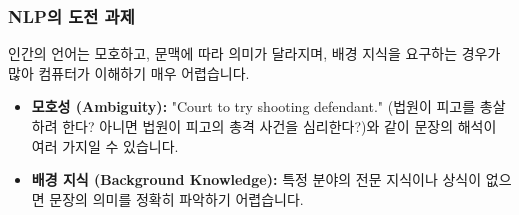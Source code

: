 \documentclass[11pt,a4paper]{article}
\begin{document}
\subsubsection{NLP의 도전 과제}
인간의 언어는 모호하고, 문맥에 따라 의미가 달라지며, 배경 지식을 요구하는 경우가 많아 컴퓨터가 이해하기 매우 어렵습니다.
\begin{itemize}
    \item \textbf{모호성 (Ambiguity):} "Court to try shooting defendant." (법원이 피고를 총살하려 한다? 아니면 법원이 피고의 총격 사건을 심리한다?)와 같이 문장의 해석이 여러 가지일 수 있습니다.
    \item \textbf{배경 지식 (Background Knowledge):} 특정 분야의 전문 지식이나 상식이 없으면 문장의 의미를 정확히 파악하기 어렵습니다.
\end{itemize}
\end{document}
